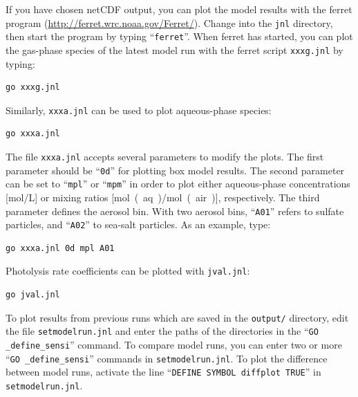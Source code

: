 \documentclass[twoside]{article}
\begin{document}
If you have chosen netCDF output, you can plot the model results with
the ferret program (\url{http://ferret.wrc.noaa.gov/Ferret/}). Change
into the \verb|jnl| directory, then start the program by typing
``\verb|ferret|''. When ferret has started, you can plot the gas-phase
species of the latest model run with the ferret script \verb|xxxg.jnl|
by typing:
\begin{verbatim}
go xxxg.jnl
\end{verbatim}
Similarly, \verb|xxxa.jnl| can be used to plot aqueous-phase species:
\begin{verbatim}
go xxxa.jnl
\end{verbatim}
The file \verb|xxxa.jnl| accepts several parameters to modify the plots.
The first parameter should be ``\verb|0d|'' for plotting box model
results. The second parameter can be set to ``\verb|mpl|'' or
``\verb|mpm|'' in order to plot either aqueous-phase concentrations
[\unit{mol/L}] or mixing ratios [\unit{mol(aq)/mol(air)}], respectively.
The third parameter defines the aerosol bin. With two aerosol bins,
``\verb|A01|'' refers to sulfate particles, and ``\verb|A02|'' to
sea-salt particles. As an example, type:
\begin{verbatim}
go xxxa.jnl 0d mpl A01
\end{verbatim}
Photolysis rate coefficients can be plotted with \verb|jval.jnl|:
\begin{verbatim}
go jval.jnl
\end{verbatim}
To plot results from previous runs which are saved in the \verb|output/|
directory, edit the file \verb|setmodelrun.jnl| and enter the paths of
the directories in the ``\verb|GO _define_sensi|'' command. To compare
model runs, you can enter two or more ``\verb|GO _define_sensi|''
commands in \verb|setmodelrun.jnl|. To plot the difference between model
runs, activate the line ``\verb|DEFINE SYMBOL diffplot TRUE|'' in
\verb|setmodelrun.jnl|.
\end{document}
